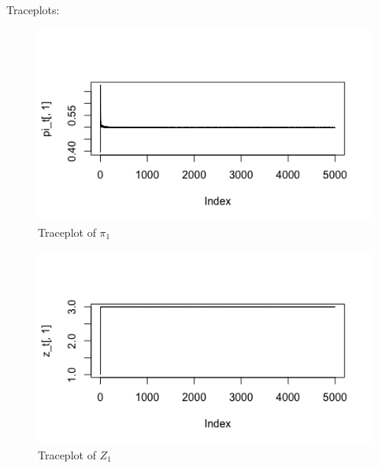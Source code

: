 \documentclass[11pt]{article}
\begin{document}
Traceplots:

\begin{figure}[H]
    \centering
    \includegraphics[width=15cm]{figures/pi_1 plot.png}
    \caption{Traceplot of $\pi_1$}
\end{figure}

\begin{figure}[H]
    \centering
    \includegraphics[width=15cm]{figures/z_1 plot.png}
    \caption{Traceplot of $Z_1$}
\end{figure}
\end{document}

